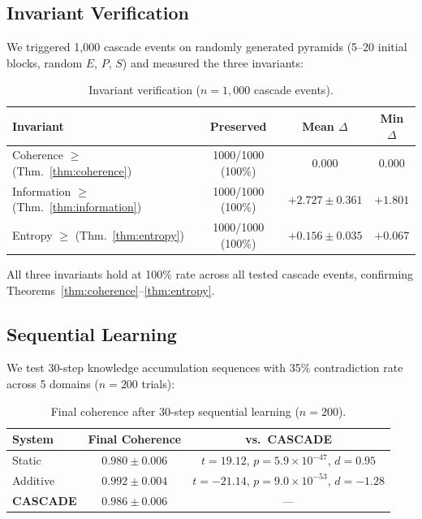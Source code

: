 \documentclass[11pt,a4paper]{article}
\theoremstyle{definition}
\begin{document}
\subsection{Invariant Verification}\label{sec:invariants}

We triggered 1{,}000 cascade events on randomly generated pyramids (5--20 initial blocks, random $E$, $P$, $S$) and measured the three invariants:

\begin{table}[H]
\centering
\caption{Invariant verification ($n = 1{,}000$ cascade events).}
\label{tab:invariants}
\begin{tabular}{@{}lccc@{}}
\toprule
\textbf{Invariant} & \textbf{Preserved} & \textbf{Mean $\Delta$} & \textbf{Min $\Delta$} \\
\midrule
Coherence $\geq$ (Thm.~\ref{thm:coherence}) & 1000/1000 (100\%) & $0.000$ & $0.000$ \\
Information $\geq$ (Thm.~\ref{thm:information}) & 1000/1000 (100\%) & $+2.727 \pm 0.361$ & $+1.801$ \\
Entropy $\geq$ (Thm.~\ref{thm:entropy}) & 1000/1000 (100\%) & $+0.156 \pm 0.035$ & $+0.067$ \\
\bottomrule
\end{tabular}
\end{table}

All three invariants hold at 100\% rate across all tested cascade events, confirming Theorems~\ref{thm:coherence}--\ref{thm:entropy}.

\subsection{Sequential Learning}\label{sec:sequential}

We test 30-step knowledge accumulation sequences with 35\% contradiction rate across 5 domains ($n = 200$ trials):

\begin{table}[H]
\centering
\caption{Final coherence after 30-step sequential learning ($n=200$).}
\label{tab:sequential}
\begin{tabular}{@{}lcc@{}}
\toprule
\textbf{System} & \textbf{Final Coherence} & \textbf{vs.\ CASCADE} \\
\midrule
Static & $0.980 \pm 0.006$ & $t = 19.12$, $p = 5.9 \times 10^{-47}$, $d = 0.95$ \\
Additive & $0.992 \pm 0.004$ & $t = -21.14$, $p = 9.0 \times 10^{-53}$, $d = -1.28$ \\
\textbf{CASCADE} & $\mathbf{0.986 \pm 0.006}$ & --- \\
\bottomrule
\end{tabular}
\end{table}
\end{document}
